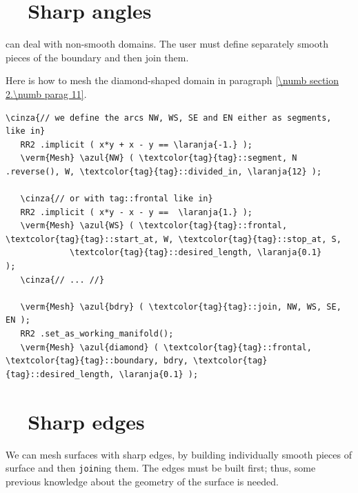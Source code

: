 \section{~~Sharp angles}\label{\numb section 3.\numb parag 17}

{\ManiFEM} can deal with non-smooth domains.
The user must define separately smooth pieces of the boundary and then join them.

Here is how to mesh the diamond-shaped domain in paragraph \ref{\numb section 2.\numb parag 11}.

\begin{Verbatim}[commandchars=\\\{\},formatcom=\small\tt,frame=single,
   label=parag-\ref{\numb section 3.\numb parag 17}.cpp,rulecolor=\color{moldura},
   baselinestretch=0.94,framesep=2mm                                            ]
   \cinza{// we define the arcs NW, WS, SE and EN either as segments, like in}
   RR2 .implicit ( x*y + x - y == \laranja{-1.} );
   \verm{Mesh} \azul{NW} ( \textcolor{tag}{tag}::segment, N .reverse(), W, \textcolor{tag}{tag}::divided_in, \laranja{12} );
   
   \cinza{// or with tag::frontal like in}
   RR2 .implicit ( x*y - x - y ==  \laranja{1.} );
   \verm{Mesh} \azul{WS} ( \textcolor{tag}{tag}::frontal, \textcolor{tag}{tag}::start_at, W, \textcolor{tag}{tag}::stop_at, S,
             \textcolor{tag}{tag}::desired_length, \laranja{0.1}               );
   \cinza{// ... //}
             
   \verm{Mesh} \azul{bdry} ( \textcolor{tag}{tag}::join, NW, WS, SE, EN );
   RR2 .set_as_working_manifold();
   \verm{Mesh} \azul{diamond} ( \textcolor{tag}{tag}::frontal, \textcolor{tag}{tag}::boundary, bdry, \textcolor{tag}{tag}::desired_length, \laranja{0.1} );
\end{Verbatim}


\section{~~Sharp edges}\label{\numb section 3.\numb parag 18}

We can mesh surfaces with sharp edges, by building individually smooth pieces of surface
and then {\small\tt join}ing them.
The edges must be built first;
thus, some previous knowledge about the geometry of the surface is needed.


